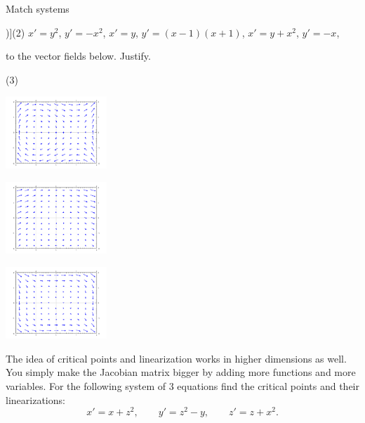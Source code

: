 \begin{exercise}
Match systems
\begin{tasks}[counter-format=tsk[1])](2)
\task $x'=y^2$, \enspace $y'=-x^2$,
\task $x'=y$, \enspace $y'=(x-1)(x+1)$,
\task $x'=y+x^2$, \enspace $y'=-x$,
\end{tasks}
to the vector fields below.  Justify.
\begin{tasks}(3)
\task
\parbox[c]{1.6in}{\includegraphics[width=1.5in]{figures/nlin-exer-y-xm1xp1}}
\task
\parbox[c]{1.6in}{\includegraphics[width=1.5in]{figures/nlin-exer-ypx2-mx}}
\task
\parbox[c]{1.6in}{\includegraphics[width=1.5in]{figures/nlin-exer-y2-mx2}}
\end{tasks}
\end{exercise}


\begin{samepage}
\begin{exercise}
The idea of critical points and linearization works in higher dimensions as
well.  You simply make the Jacobian matrix bigger by adding more functions
and more variables.  For the following system
of 3 equations find the critical points and their linearizations:
\begin{equation*}
x' = x + z^2, \qquad y' = z^2-y, \qquad z' = z+x^2.
\end{equation*}
\end{exercise}
\end{samepage}

